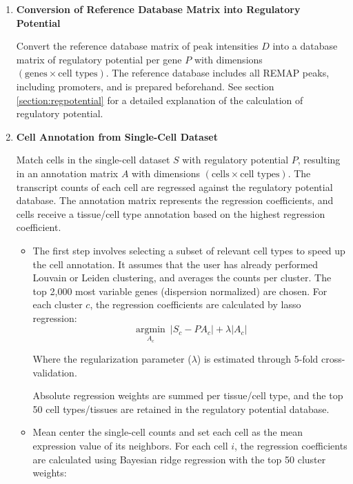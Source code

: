 \begin{enumerate}
    \item \textbf{Conversion of Reference Database Matrix into Regulatory Potential}
    
    Convert the reference database matrix of peak intensities $D$ into a database matrix of regulatory potential\cite{Wang2016} per gene $P$ with dimensions $(\text{genes} \times \text{cell types})$. The reference database includes all REMAP peaks, including promoters, and is prepared beforehand. See section \ref{section:regpotential} for a detailed explanation of the calculation of regulatory potential.

    \item \textbf{Cell Annotation from Single-Cell Dataset}
    
    Match cells in the single-cell dataset $S$ with regulatory potential $P$, resulting in an annotation matrix $A$ with dimensions $(\text{cells} \times \text{cell types})$. The transcript counts of each cell are regressed against the regulatory potential database. The annotation matrix represents the regression coefficients, and cells receive a tissue/cell type annotation based on the highest regression coefficient.
    
    \begin{itemize}
        \item The first step involves selecting a subset of relevant cell types to speed up the cell annotation. It assumes that the user has already performed Louvain or Leiden clustering, and averages the counts per cluster. The top 2,000 most variable genes (dispersion normalized) are chosen. For each cluster $c$, the regression coefficients are calculated by lasso regression:
        \begin{equation*}
            \underset{A_c}{\operatorname{argmin}}\ |S_c - P A_c| + \lambda |A_c|
        \end{equation*}

        Where the regularization parameter ($\lambda$) is estimated through 5-fold cross-validation.

        Absolute regression weights are summed per tissue/cell type, and the top 50 cell types/tissues are retained in the regulatory potential database.
        
        \item Mean center the single-cell counts and set each cell as the mean expression value of its neighbors. For each cell $i$, the regression coefficients are calculated using Bayesian ridge regression with the top 50 cluster weights:


\end{itemize}
\end{enumerate}
